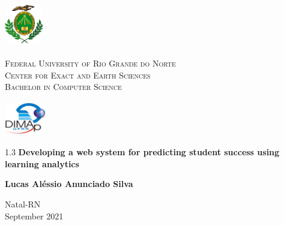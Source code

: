 
\begin{titlepage}
	\begin{center}
		
		\begin{minipage}{2cm}
			\begin{center}
				\includegraphics[width=1.7cm, height=2.0cm]{Imagens/Brasao-UFRN.jpg}
			\end{center}
		\end{minipage}
		\begin{minipage}{11cm}
			\begin{center}
				\begin{espacosimples}
					{\small \textsc{Federal University of Rio Grande do Norte}			\\
							  \textsc{Center for Exact and Earth Sciences}						\\
\textsc{Bachelor in Computer Science}}
				\end{espacosimples}
			\end{center}
		\end{minipage}
		\begin{minipage}{2cm}
			\begin{center}
				\includegraphics[width=1.8cm, height=1.5cm]{Imagens/Logotipo-DIMAp.jpg}
			\end{center}
		\end{minipage}
			
		\vspace{6cm}
						
		{\setlength{\baselineskip}%
		{1.3\baselineskip}
		{\LARGE \textbf{Developing a web system for predicting student success using learning analytics}}\par}
			
		\vspace{4cm}
			
		{\large \textbf{Lucas Aléssio Anunciado Silva}}
						
		\vspace{7cm}
		
		Natal-RN\\ September 2021
	\end{center}
\end{titlepage}